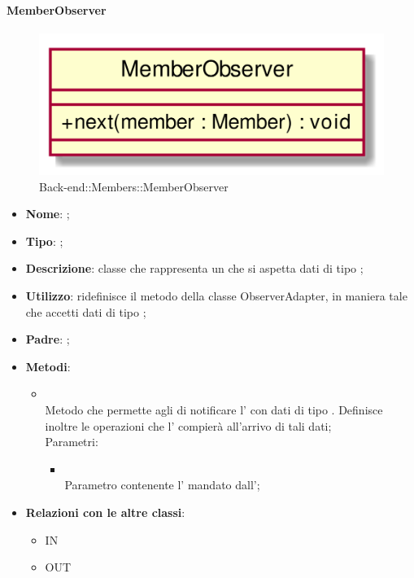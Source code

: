 \hypertarget{MemberObserver_label}{\paragraph{MemberObserver}}
\begin{figure}[h]
	\centering
	\includegraphics[width=\textwidth,height=\textheight,keepaspectratio]{images/ClassMemberObserver.png}
	\caption{Back-end::Members::MemberObserver}
\end{figure}
\begin{itemize}
	\item \textbf{Nome}: ;
	\item \textbf{Tipo}: ;
	\item \textbf{Descrizione}: classe che rappresenta un  che si aspetta dati di tipo ;
	\item \textbf{Utilizzo}: ridefinisce il metodo  della classe ObserverAdapter, in maniera tale che accetti dati di tipo ;
	\item \textbf{Padre}: ;
	\item \textbf{Metodi}:
	\begin{itemize}
		\item[]  \\
		Metodo che permette agli  di notificare l' con dati di tipo . Definisce inoltre le operazioni che l' compierà all'arrivo di tali dati;\\
		Parametri:
		\begin{itemize}
			\item {} \\
			Parametro contenente l' mandato dall';
		\end{itemize}
	\end{itemize}
	\item \textbf{Relazioni con le altre classi}:
	\begin{itemize}
		\item IN \hyperlink{MemberObservable_label}{}
		\item OUT \hyperlink{Member_label}{}
	\end{itemize}
\end{itemize}
\FloatBarrier

